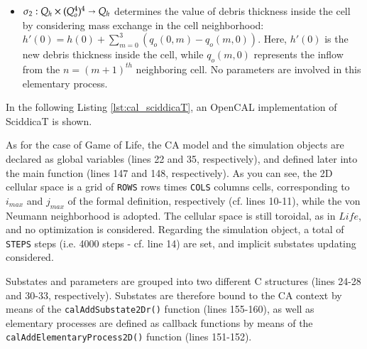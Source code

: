 \begin{itemize}
\begin{itemize}

\item $\sigma_2: Q_h \times (Q_o^4)^4 \shortrightarrow Q_h$ determines
  the value of debris thickness inside the cell by considering mass
  exchange in the cell neighborhood: $h'(0) = h(0) + \sum_{m=0}^3
  (q_o(0,m) - q_o(m,0))$. Here, $h'(0)$ is the new debris
  thickness inside the cell, while $q_o(m,0)$ represents the inflow from
  the $n=(m+1)^{th}$ neighboring cell. No parameters are involved in
  this elementary process.

\end{itemize}
\end{itemize}

In the following Listing \ref{lst:cal_sciddicaT}, an OpenCAL
implementation of SciddicaT is shown.



As for the case of Game of Life, the CA model and the simulation
objects are declared as global variables (lines 22 and 35,
respectively), and defined later into the main function (lines 147 and
148, respectively). As you can see, the 2D cellular space is a grid
of \verb'ROWS' rows times \verb'COLS' columns cells, corresponding to
$i_{max}$ and $j_{max}$ of the formal definition, respectively
(cf. lines 10-11), while the von Neumann neighborhood is adopted. The
cellular space is still toroidal, as in $Life$, and no optimization is
considered. Regarding the simulation object, a total of \verb'STEPS'
steps (i.e. 4000 steps - cf. line 14) are set, and implicit substates
updating considered.

Substates and parameters are grouped into two different C structures
(lines 24-28 and 30-33, respectively). Substates are therefore bound to
the CA context by means of the \verb'calAddSubstate2Dr()' function
(lines 155-160), as well as elementary processes are defined as
callback functions by means of the \verb'calAddElementaryProcess2D()'
function (lines 151-152).

